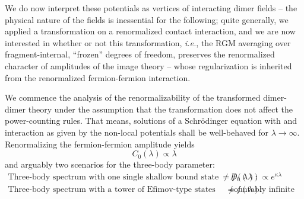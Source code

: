 \documentclass[onecolumn,preprint,superscriptaddress,nofootinbib,notitlepage,10pt,linenumbers]{revtex4-1}
\newcommand{\la}{\label}
\newcommand{\be}{\begin{equation}}
\newcommand{\ee}{\end{equation}}
\newcommand{\ie}{\textit{i.e.}\;}
\begin{document}
We do now interpret these potentials as vertices of interacting dimer fields -- the physical nature of the fields is
inessential for the following; quite generally, we applied a transformation on a renormalized contact interaction, and
we are now interested in whether or not this transformation, \ie, the RGM averaging over fragment-internal, ``frozen''
degrees of freedom, preserves the renormalized character of amplitudes of the image theory -- whose regularization is
inherited from the renormalized fermion-fermion interaction.

We commence the analysis of the renormalizability of the transformed dimer-dimer theory under the assumption that
the transformation does not affect the power-counting rules. That means, solutions of a Schr\"odinger equation
with and interaction as given by the non-local potentials shall be well-behaved for $\lambda\to\infty$.
Renormalizing the fermion-fermion amplitude yields
\be\la{eq.c0running}
C_0(\lambda)\propto\lambda
\ee
and arguably two scenarios for the three-body parameter:
\begin{align}
\text{Three-body spectrum with one single shallow bound state}~\neq f(\lambda):~&D_0(\lambda)\propto e^{\kappa\lambda}\\
\text{Three-body spectrum with a tower of Efimov-type states with the shallowest}~\neq f(\lambda):~&\text{countably infinite poles}
\end{align}
\end{document}
